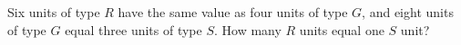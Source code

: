 Six units of type $R$ have the same value as four units of type $G$, and eight units of type $G$ equal three units of type $S$. How many $R$ units equal one $S$ unit?
